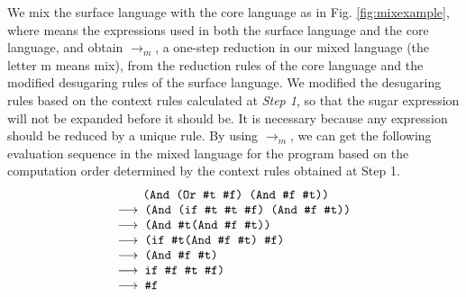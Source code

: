 We mix the surface language with the core language as in Fig. \ref{fig:mixexample}, where  means the expressions used in both the surface language and the core language, and obtain $\to_m$, a one-step reduction in our mixed language (the letter m means mix), from the reduction rules of the core language and the modified desugaring rules of the surface language. We modified the desugaring rules based on the context rules calculated at {\em Step 1}, so that the sugar expression will not be expanded before it should be. It is necessary because any expression should be reduced by a unique rule. By using $\to_m$, we can get the following evaluation sequence in the mixed language for
the program  based on the computation order determined by the context rules obtained at Step 1.
\[
    \begin{array}{l}
        \qquad\Code{(And (Or \true~\false) (And \false~\true))}\\
        \OneStep{ \Code{ (And (if \true~\true~\false) (And \false~\true))}}\\
        \OneStep{\Code{ (And \true (And \false~\true))}}\\
        \OneStep{\Code{ (if \true (And \false~\true) \false)}}\\
        \OneStep{\Code{ (And \false~\true)}}\\
        \OneStep{\Code{ if \false~\true~\false)}}\\
        \OneStep{\Code{ \false}}\\
    \end{array}
\]




